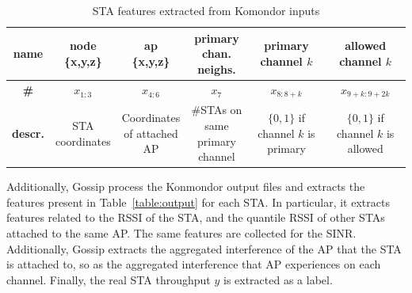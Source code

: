 \documentclass{article}
\begin{document}
\begin{table}[h]
    \label{table:input}
    \centering
    \caption{STA features extracted from Komondor inputs}
    \begin{adjustbox}{max width=\textwidth}
    \begin{tabular}{| c || c | c | c | c | c |}
        \hline
        \textbf{name} & \makecell{node\\ \{x,y,z\}} & \makecell{ap\\ \{x,y,z\}} & \makecell{primary\\ chan. neighs.} & \makecell{primary\\channel $k$} & \makecell{allowed\\channel $k$} \\ \hline
        \textbf{\#} & $x_{1:3}$ & $x_{4:6}$ & $x_7$ & $x_{8:8+k}$ & $x_{9+k:9+2k}$\\ \hline
        \textbf{descr.} & \makecell{STA\\coordinates} & \makecell{Coordinates\\of attached\\AP} & \makecell{\#STAs on\\same primary\\channel} & \makecell{$\{0,1\}$ if\\channel $k$\\ is primary}  & \makecell{$\{0,1\}$ if\\channel $k$\\is allowed} \\\hline

    \end{tabular}
    \end{adjustbox}
\end{table}



Additionally, Gossip process the Konmondor output
files and extracts the features present in
Table~\ref{table:output} for each STA.
In particular, it extracts features related to the
RSSI of the STA, and the quantile RSSI of other
STAs attached to the same AP. The same features
are collected for the SINR. Additionally, Gossip
extracts the aggregated interference of the AP
that the STA is attached to, so as the aggregated
interference that AP experiences on each channel.
Finally, the real STA throughput $y$ is extracted as a
label.
\end{document}
